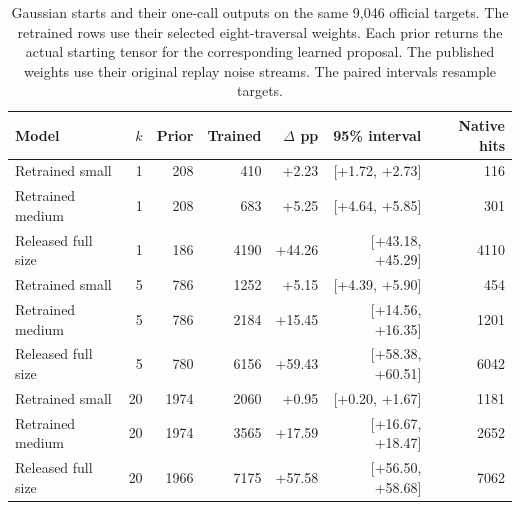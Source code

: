 \begin{table}[!htbp]\centering\small\setlength{\tabcolsep}{3.6pt}
\caption{Gaussian starts and their one-call outputs on the same 9,046 official targets. The retrained rows use their selected eight-traversal weights. Each prior returns the actual starting tensor for the corresponding learned proposal. The published weights use their original replay noise streams. The paired intervals resample targets.}
\begin{tabular}{lrrrrrr}\hline
Model & $k$ & Prior & Trained & $\Delta$ pp & 95\% interval & Native hits\\\hline
Retrained small & 1 & 208 & 410 & +2.23 & [+1.72, +2.73] & 116\\
Retrained medium & 1 & 208 & 683 & +5.25 & [+4.64, +5.85] & 301\\
Released full size & 1 & 186 & 4190 & +44.26 & [+43.18, +45.29] & 4110\\
Retrained small & 5 & 786 & 1252 & +5.15 & [+4.39, +5.90] & 454\\
Retrained medium & 5 & 786 & 2184 & +15.45 & [+14.56, +16.35] & 1201\\
Released full size & 5 & 780 & 6156 & +59.43 & [+58.38, +60.51] & 6042\\
Retrained small & 20 & 1974 & 2060 & +0.95 & [+0.20, +1.67] & 1181\\
Retrained medium & 20 & 1974 & 3565 & +17.59 & [+16.67, +18.47] & 2652\\
Released full size & 20 & 1966 & 7175 & +57.58 & [+56.50, +58.68] & 7062\\
\hline\end{tabular}\end{table}
